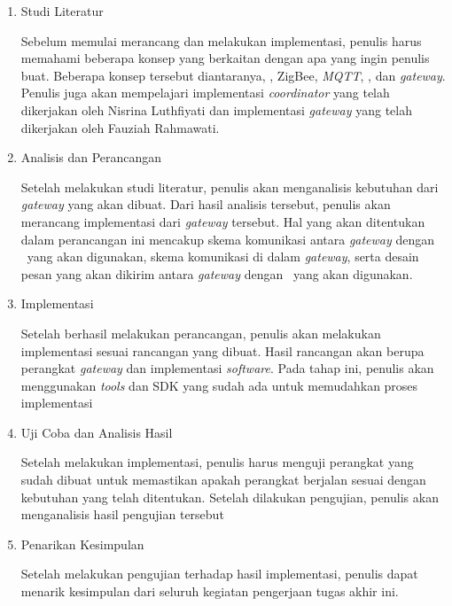 \begin{enumerate}
	\item Studi Literatur
	
	Sebelum memulai merancang dan melakukan implementasi, penulis harus memahami beberapa konsep yang berkaitan dengan apa yang ingin penulis buat. Beberapa konsep tersebut diantaranya, \iot, ZigBee, \textit{MQTT}, \siot, dan \textit{gateway}. Penulis juga akan mempelajari implementasi \textit{coordinator} yang telah dikerjakan oleh Nisrina Luthfiyati\cite{SkripsiNina} dan implementasi \textit{gateway} yang telah dikerjakan oleh Fauziah Rahmawati\cite{SkripsiFarah}.
	\item Analisis dan Perancangan
	
	Setelah melakukan studi literatur, penulis akan menganalisis kebutuhan dari \textit{gateway} yang akan dibuat. Dari hasil analisis tersebut, penulis akan merancang implementasi dari \textit{gateway} tersebut. Hal yang akan ditentukan dalam perancangan ini mencakup skema komunikasi antara \textit{gateway} dengan \plat~yang akan digunakan, skema komunikasi di dalam \textit{gateway}, serta desain pesan yang akan dikirim antara \textit{gateway} dengan \plat~yang akan digunakan.
	\item Implementasi
	
	Setelah berhasil melakukan perancangan, penulis akan melakukan implementasi sesuai rancangan yang dibuat. Hasil rancangan akan berupa perangkat \textit{gateway} dan implementasi \textit{software}. Pada tahap ini, penulis akan menggunakan \textit{tools} dan SDK yang sudah ada untuk memudahkan proses implementasi
	\item Uji Coba dan Analisis Hasil
	
	Setelah melakukan implementasi, penulis harus menguji perangkat yang sudah dibuat untuk memastikan apakah perangkat berjalan sesuai dengan kebutuhan yang telah ditentukan. Setelah dilakukan pengujian, penulis akan menganalisis hasil pengujian tersebut
	\item Penarikan Kesimpulan
	
	Setelah melakukan pengujian terhadap hasil implementasi, penulis dapat menarik kesimpulan dari seluruh kegiatan pengerjaan tugas akhir ini.
\end{enumerate}


